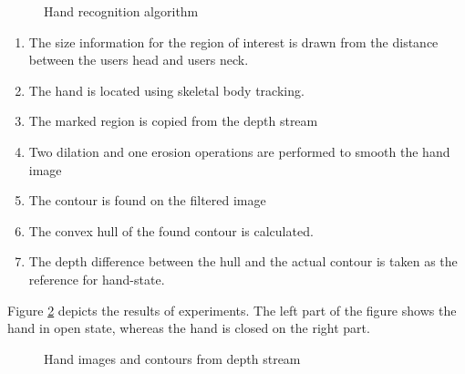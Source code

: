 \begin{figure}[h]
\centerline{}
\caption{Hand recognition algorithm}
\label{fig:hand_recognition_cycle}
\end{figure} 

\begin{enumerate}
\item The size information for the region of interest is drawn from the distance between the users head and users neck.
\item The hand is located using skeletal body tracking.
\item The marked region is copied from the depth stream 
\item Two dilation and one erosion operations are performed to smooth the hand image
\item The contour is found on the filtered image
\item The convex hull of the found contour is calculated.
\item The depth difference between the hull and the actual contour is taken as the reference for hand-state.
\end{enumerate}

Figure \ref{fig:open_closed_hands} depicts the results of experiments. The left part of the figure shows the hand in open state, whereas the hand is closed on the right part.

\begin{figure}[h]
\centerline{}
\caption{Hand images and contours from depth stream}
\label{fig:open_closed_hands}
\end{figure}


